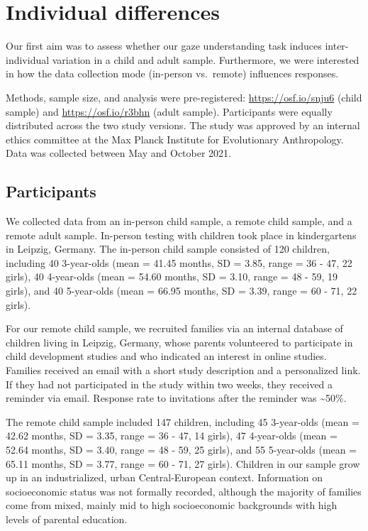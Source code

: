 \documentclass[
  man,floatsintext]{apa6}
\begin{document}
\hypertarget{individual-differences}{%
\section{Individual differences}\label{individual-differences}}

Our first aim was to assess whether our gaze understanding task induces inter-individual variation in a child and adult sample.
Furthermore, we were interested in how the data collection mode (in-person vs.~remote) influences responses.

Methods, sample size, and analysis were pre-registered: \url{https://osf.io/snju6} (child sample) and \url{https://osf.io/r3bhn} (adult sample).
Participants were equally distributed across the two study versions.
The study was approved by an internal ethics committee at the Max Planck Institute for Evolutionary Anthropology.
Data was collected between May and October 2021.

\hypertarget{participants}{%
\subsection{Participants}\label{participants}}

We collected data from an in-person child sample, a remote child sample, and a remote adult sample.
In-person testing with children took place in kindergartens in Leipzig, Germany.
The in-person child sample consisted of 120 children, including 40 3-year-olds (mean = 41.45 months, SD = 3.85, range = 36 - 47, 22 girls), 40 4-year-olds (mean = 54.60 months, SD = 3.10, range = 48 - 59, 19 girls), and 40 5-year-olds (mean = 66.95 months, SD = 3.39, range = 60 - 71, 22 girls).

For our remote child sample, we recruited families via an internal database of children living in Leipzig, Germany, whose parents volunteered to participate in child development studies and who indicated an interest in online studies.
Families received an email with a short study description and a personalized link.
If they had not participated in the study within two weeks, they received a reminder via email.
Response rate to invitations after the reminder was \textasciitilde50\%.

The remote child sample included 147 children, including 45 3-year-olds (mean = 42.62 months, SD = 3.35, range = 36 - 47, 14 girls), 47 4-year-olds (mean = 52.64 months, SD = 3.40, range = 48 - 59, 25 girls), and 55 5-year-olds (mean = 65.11 months, SD = 3.77, range = 60 - 71, 27 girls).
Children in our sample grow up in an industrialized, urban Central-European context.
Information on socioeconomic status was not formally recorded, although the majority of families come from mixed, mainly mid to high socioeconomic backgrounds with high levels of parental education.
\end{document}
